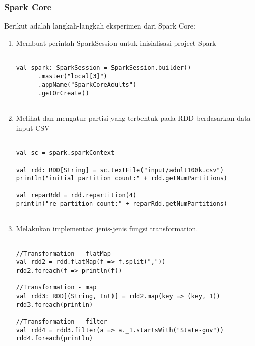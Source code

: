 \subsubsection{Spark Core}
\noindent Berikut adalah langkah-langkah eksperimen dari Spark Core:
\begin{enumerate}

\item Membuat perintah SparkSession untuk inisialisasi project Spark
\begin{lstlisting}[basicstyle=\ttfamily, frame=single,
	columns=fullflexible, keepspaces=true, breaklines=true, label=ls_kepatuhan_1_1_1_logo_sharif_judge, caption=Main method]

val spark: SparkSession = SparkSession.builder()
      .master("local[3]")
      .appName("SparkCoreAdults")
      .getOrCreate()	
      
\end{lstlisting}

\item Melihat dan mengatur partisi yang terbentuk pada RDD berdasarkan data input CSV
\begin{lstlisting}[basicstyle=\ttfamily, frame=single,
	columns=fullflexible, keepspaces=true, breaklines=true, label=ls_kepatuhan_1_1_1_logo_sharif_judge, caption=Main method]
	
val sc = spark.sparkContext

val rdd: RDD[String] = sc.textFile("input/adult100k.csv")
println("initial partition count:" + rdd.getNumPartitions)

val reparRdd = rdd.repartition(4)
println("re-partition count:" + reparRdd.getNumPartitions)	
	
\end{lstlisting}

\item Melakukan implementasi jenis-jenis fungsi transformation.
\begin{lstlisting}[basicstyle=\ttfamily, frame=single,
	columns=fullflexible, keepspaces=true, breaklines=true, label=ls_kepatuhan_1_1_1_logo_sharif_judge, caption=Main method]
	
//Transformation - flatMap
val rdd2 = rdd.flatMap(f => f.split(","))
rdd2.foreach(f => println(f))

//Transformation - map
val rdd3: RDD[(String, Int)] = rdd2.map(key => (key, 1))
rdd3.foreach(println)

//Transformation - filter
val rdd4 = rdd3.filter(a => a._1.startsWith("State-gov"))
rdd4.foreach(println)


\end{lstlisting}
\end{enumerate}
